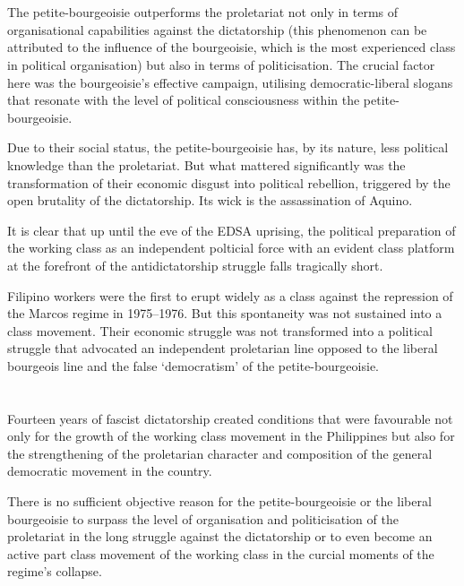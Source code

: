 \section{}
The petite-bourgeoisie outperforms the proletariat 
not only in terms of organisational capabilities 
against the dictatorship
(this phenomenon can be attributed 
to the influence of the bourgeoisie, 
which is the most experienced class in political organisation)
but also in terms of politicisation. 
The crucial factor here 
was the bourgeoisie's effective campaign, 
utilising democratic-liberal slogans 
that resonate with the level of political consciousness 
within the petite-bourgeoisie.

Due to their social status,
the petite-bourgeoisie has, 
by its nature,
less political knowledge 
than the proletariat.
But what mattered significantly was the transformation 
of their economic disgust into political rebellion,
triggered by the open brutality of the dictatorship. 
Its wick is the assassination of Aquino.

It is clear that 
up until the eve of the EDSA uprising,
the political preparation of the working class 
as an independent polticial force
with an evident class platform 
at the forefront of the antidictatorship struggle
falls tragically short.

Filipino workers were the first to erupt 
widely as a class against the repression 
of the Marcos regime in 1975--1976. 
But this spontaneity was not sustained into a class movement. 
Their economic struggle was not transformed 
into a political struggle 
that advocated an independent proletarian line 
opposed to the liberal bourgeois line 
and the false `democratism' of the petite-bourgeoisie.


\section{}
Fourteen years of fascist dictatorship 
created conditions that were favourable not only 
for the growth of the working class movement in the Philippines 
but also for the strengthening of the proletarian character 
and composition of the general democratic movement in the country.

There is no sufficient objective reason 
for the petite-bourgeoisie or the liberal bourgeoisie 
to surpass the level of organisation and politicisation of the proletariat 
in the long struggle against the dictatorship 
or to even become an active part 
class movement of the working class 
in the curcial moments of the regime's collapse.

